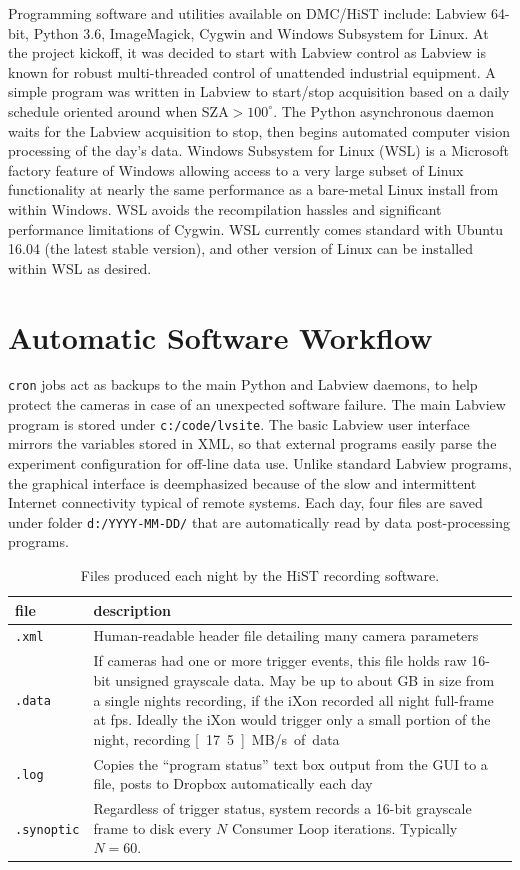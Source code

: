 Programming software and utilities available on DMC/HiST include: Labview 64-bit, Python 3.6, ImageMagick, Cygwin and Windows Subsystem for Linux.
At the project kickoff, it was decided to start with Labview control as Labview is known for robust multi-threaded control of unattended industrial equipment.
A simple program was written in Labview to start/stop acquisition based on a daily schedule oriented around when SZA$> 100^\circ$.
The Python asynchronous daemon waits for the Labview acquisition to stop, then begins automated computer vision processing of the day's data.
Windows Subsystem for Linux (WSL) is a Microsoft factory feature of Windows allowing access to a very large subset of Linux functionality at nearly the same performance as a bare-metal Linux install from within Windows.
WSL avoids the recompilation hassles and significant performance limitations of Cygwin.
WSL currently comes standard with Ubuntu 16.04 (the latest stable version), and other version of Linux can be installed within WSL as desired.

\section{Automatic Software Workflow}\label{sec:autoAlgo}
\texttt{cron} jobs act as backups to the main Python and Labview daemons, to help protect the cameras in case of an unexpected software failure.
The main Labview program is stored under \texttt{c:/code/lvsite}. 
The basic Labview user interface mirrors the variables stored in XML, so that external programs easily parse the experiment configuration for off-line data use.
Unlike standard Labview programs, the graphical interface is deemphasized because of the slow and intermittent Internet connectivity typical of remote systems.
Each day, four files are saved under folder \texttt{d:/YYYY-MM-DD/} that are automatically read by data post-processing programs.
\begin{table}\centering
    \caption{Files produced each night by the HiST recording software.}\label{tab:filewritten}
    \begin{tabular}{p{2cm}p{12cm}}
    \toprule
    file & description \\
    \midrule
    \texttt{.xml} & Human-readable header file detailing many camera parameters \\
    \texttt{.data} & If cameras had one or more trigger events, this file holds raw 16-bit unsigned grayscale data. May be up to about \unit[400]{GB} in size from a single nights recording, if the iXon recorded all night full-frame at \unit[33]{fps}. Ideally the iXon would trigger only a small portion of the night, recording \unit[17.5]{MB/s} of data \\
    \texttt{.log} & Copies the ``program status'' text box output from the GUI to a file, posts to Dropbox automatically each day\\
    \texttt{.synoptic} & Regardless of trigger status, system records a 16-bit grayscale frame to disk every $N$ Consumer Loop iterations. Typically $N=60$. \\
    \bottomrule
    \end{tabular}
\end{table}


